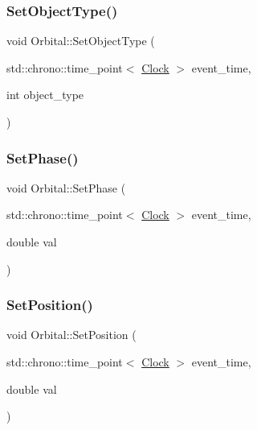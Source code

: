 \mbox{\label{classOrbital_afd0dfd382d4bf7d9fbace315bd37fa85}} 
\subsubsection{\texorpdfstring{Set\+Object\+Type()}{SetObjectType()}}
{\footnotesize\ttfamily void Orbital\+::\+Set\+Object\+Type (\begin{DoxyParamCaption}\item[{std\+::chrono\+::time\+\_\+point$<$ \mbox{\hyperlink{universe_8h_a0ef8d951d1ca5ab3cfaf7ab4c7a6fd80}{Clock}} $>$}]{event\+\_\+time,  }\item[{int}]{object\+\_\+type }\end{DoxyParamCaption})}

\mbox{\label{classOrbital_ac1c58fcb56e4d5c19c4ab39cc09c88ad}} 
\subsubsection{\texorpdfstring{Set\+Phase()}{SetPhase()}}
{\footnotesize\ttfamily void Orbital\+::\+Set\+Phase (\begin{DoxyParamCaption}\item[{std\+::chrono\+::time\+\_\+point$<$ \mbox{\hyperlink{universe_8h_a0ef8d951d1ca5ab3cfaf7ab4c7a6fd80}{Clock}} $>$}]{event\+\_\+time,  }\item[{double}]{val }\end{DoxyParamCaption})\hspace{0.3cm}{\ttfamily [inline]}}

\mbox{\label{classOrbital_a16ff46f7e720f2f7aed332585310a9b8}} 
\subsubsection{\texorpdfstring{Set\+Position()}{SetPosition()}}
{\footnotesize\ttfamily void Orbital\+::\+Set\+Position (\begin{DoxyParamCaption}\item[{std\+::chrono\+::time\+\_\+point$<$ \mbox{\hyperlink{universe_8h_a0ef8d951d1ca5ab3cfaf7ab4c7a6fd80}{Clock}} $>$}]{event\+\_\+time,  }\item[{double}]{val }\end{DoxyParamCaption})\hspace{0.3cm}{\ttfamily [inline]}}

